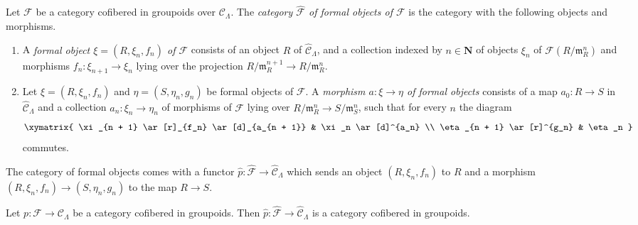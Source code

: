 \begin{definition}
\label{definition-formal-objects}
Let $\mathcal{F}$ be a category cofibered in groupoids over
$\mathcal{C}_\Lambda$. The {\it category $\widehat{\mathcal{F}}$ of formal
objects of  $\mathcal{F}$} is the category with the following objects and
morphisms.
\begin{enumerate}
\item A {\it formal object $\xi = (R, \xi_n, f_n)$ of $\mathcal{F}$}
consists of an object $R$ of $\widehat{\mathcal{C}}_\Lambda$, and a collection
indexed by $n \in \mathbf{N}$ of objects $\xi_n$ of
$\mathcal{F}(R/\mathfrak m_R^n)$ and morphisms
$f_n : \xi_{n + 1} \to \xi_n$ lying over the projection
$R/\mathfrak m_R^{n + 1} \to R/\mathfrak m_R^n$.
\item Let $\xi = (R, \xi_n, f_n)$ and $\eta = (S, \eta_n, g_n)$ be
formal objects of $\mathcal{F}$.  A {\it morphism $a : \xi \to \eta$ of
formal objects} consists of a map $a_0 : R \to S$ in
$\widehat{\mathcal{C}}_\Lambda$ and a collection $a_n : \xi_n \to \eta_n$
of morphisms of $\mathcal{F}$ lying over
$R/\mathfrak m_R^n \to S/\mathfrak m_S^n$,
such that for every $n$ the diagram
$$
\xymatrix{
\xi_{n + 1} \ar[r]_{f_n} \ar[d]_{a_{n + 1}} & \xi_n \ar[d]^{a_n} \\
\eta_{n + 1} \ar[r]^{g_n} & \eta_n
}
$$
commutes.
\end{enumerate}
\end{definition}

\noindent
The category of formal objects comes with a functor $\widehat{p}:
\widehat{\mathcal{F}} \to \widehat{\mathcal{C}}_\Lambda$ which sends an
object $(R, \xi_n, f_n)$ to $R$ and a morphism
$(R, \xi_n, f_n) \to (S, \eta_n, g_n)$ to the map $R \to S$.

\begin{lemma}
\label{lemma-completion-cofibred}
Let $p : \mathcal{F} \to \mathcal{C}_\Lambda$ be a category cofibered in
groupoids. Then
$\widehat{p} : \widehat{\mathcal{F}} \to \widehat{\mathcal{C}}_\Lambda$
is a category cofibered in groupoids.
\end{lemma}


